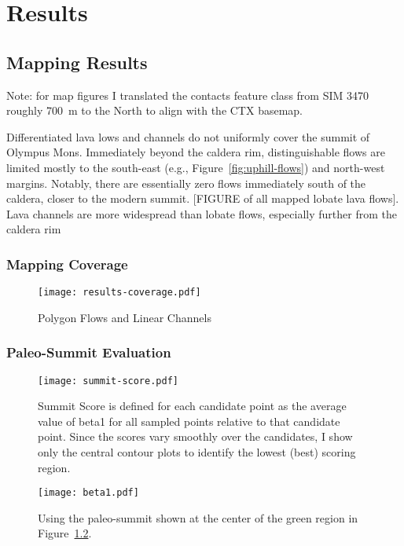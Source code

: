 \chapter{Results}

\section{Mapping Results}

Note: for map figures I translated the contacts feature class from SIM 3470 roughly \qty{700}{\m} to the North to align with the \ac{CTX} basemap.

Differentiated lava lows and channels do not uniformly cover the summit of Olympus Mons. Immediately beyond the caldera rim, distinguishable flows are limited mostly to the south-east (e.g., Figure~\ref{fig:uphill-flows}) and north-west margins. Notably, there are essentially zero flows immediately south of the caldera, closer to the modern summit. [FIGURE of all mapped lobate lava flows]. Lava channels are more widespread than lobate flows, especially further from the caldera rim 

\subsection{Mapping Coverage}
\begin{figure}
    \texttt{[image: results-coverage.pdf]}%
    \caption[Mapping Coverage]{Polygon Flows and Linear Channels}%
    \label{fig:results-coverage}
\end{figure}

\subsection{Paleo-Summit Evaluation}
\begin{figure}
    \texttt{[image: summit-score.pdf]}%
    \caption[Paleo-Summit Evaluation]{Summit Score is defined for each candidate point as the average value of \acs{beta1} for all sampled points relative to that candidate point. Since the scores vary smoothly over the candidates, I show only the central contour plots to identify the lowest (best) scoring region.}%
    \label{fig:summit-score}
\end{figure}

\begin{figure}
    \texttt{[image: beta1.pdf]}%
    \caption[Best Paleo-Summit Candidate]{Using the paleo-summit shown at the center of the green region in Figure~\ref{fig:summit-score}.}%
    \label{fig:beta1}
\end{figure}

